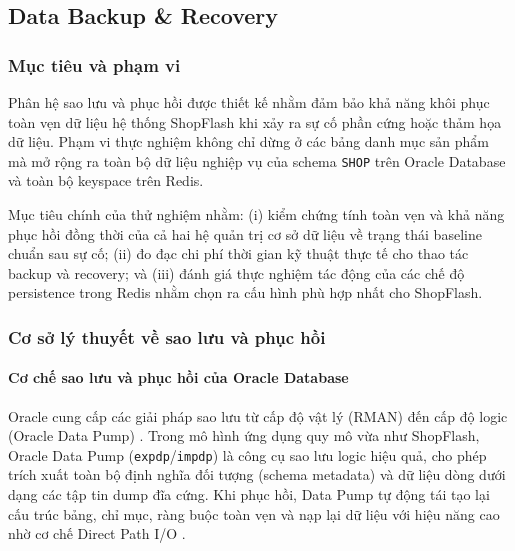 \subsection{Data Backup \& Recovery}\label{sec:backup}
\begingroup
\setcounter{table}{0}\setcounter{figure}{0}
\renewcommand{\thetable}{\thesubsection.\arabic{table}}
\renewcommand{\thefigure}{\thesubsection.\arabic{figure}}
\renewcommand{\theHtable}{\thesubsection.\arabic{table}}
\renewcommand{\theHfigure}{\thesubsection.\arabic{figure}}
\subsubsection{Mục tiêu và phạm vi}

Phân hệ sao lưu và phục hồi được thiết kế nhằm đảm bảo khả năng khôi phục toàn vẹn dữ liệu hệ thống ShopFlash khi xảy ra sự cố phần cứng hoặc thảm họa dữ liệu. Phạm vi thực nghiệm không chỉ dừng ở các bảng danh mục sản phẩm mà mở rộng ra toàn bộ dữ liệu nghiệp vụ của schema \texttt{SHOP} trên Oracle Database và toàn bộ keyspace trên Redis.

Mục tiêu chính của thử nghiệm nhằm: (i) kiểm chứng tính toàn vẹn và khả năng phục hồi đồng thời của cả hai hệ quản trị cơ sở dữ liệu về trạng thái baseline chuẩn sau sự cố; (ii) đo đạc chi phí thời gian kỹ thuật thực tế cho thao tác backup và recovery; và (iii) đánh giá thực nghiệm tác động của các chế độ persistence trong Redis nhằm chọn ra cấu hình phù hợp nhất cho ShopFlash.

\subsubsection{Cơ sở lý thuyết về sao lưu và phục hồi}

\paragraph{Cơ chế sao lưu và phục hồi của Oracle Database}

Oracle cung cấp các giải pháp sao lưu từ cấp độ vật lý (RMAN) đến cấp độ logic (Oracle Data Pump) \cite{oracleDataPump}. Trong mô hình ứng dụng quy mô vừa như ShopFlash, Oracle Data Pump (\texttt{expdp}/\texttt{impdp}) là công cụ sao lưu logic hiệu quả, cho phép trích xuất toàn bộ định nghĩa đối tượng (schema metadata) và dữ liệu dòng dưới dạng các tập tin dump đĩa cứng. Khi phục hồi, Data Pump tự động tái tạo lại cấu trúc bảng, chỉ mục, ràng buộc toàn vẹn và nạp lại dữ liệu với hiệu năng cao nhờ cơ chế Direct Path I/O \cite{oracleDataPump}.

